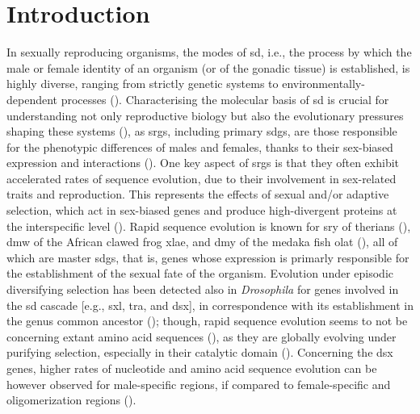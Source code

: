 \section{Introduction} \label{chapter3_introduction}
In sexually reproducing organisms, the modes of \gls{sd}, i.e., the process by which the male or female identity of an organism (or of the gonadic tissue) is established, is highly diverse, ranging from strictly genetic systems to environmentally-dependent processes (\textbf{\cite{haag2005sex, uller2011origin, bachtrog2014sex, beukeboom2014evolution}}). Characterising the molecular basis of \gls{sd} is crucial for understanding not only reproductive biology but also the evolutionary pressures shaping these systems (\textbf{\cite{wilkins1995moving, ellegren2007evolution, grath2016sex, nicolini2023bivalves}}), as \glspl{srg}, including primary \glspl{sdg}, are those responsible for the phenotypic differences of males and females, thanks to their sex-biased expression and interactions (\textbf{\cite{ellegren2007evolution, beukeboom2014evolution, grath2016sex}}). One key aspect of \glspl{srg} is that they often exhibit accelerated rates of sequence evolution, due to their involvement in sex-related traits and reproduction. This represents the effects of sexual and/or adaptive selection, which act in sex-biased genes and produce high-divergent proteins at the interspecific level (\textbf{\cite{civetta1998sex, ellegren2007evolution, meisel2011towards, grath2016sex}}). Rapid sequence evolution is known for \gls{sry} of therians (\textbf{\cite{pamilo1997evolution, mawaribuchi2012molecular}}), \gls{dmw} of the African clawed frog \gls{xlae}, and \gls{dmy} of the medaka fish \gls{olat} (\textbf{\cite{mawaribuchi2012molecular}}), all of which are master \glspl{sdg}, that is, genes whose expression is primarly responsible for the establishment of the sexual fate of the organism. Evolution under episodic diversifying selection has been detected also in \textit{Drosophila} for genes involved in the \gls{sd} cascade [e.g., \gls{sxl}, \gls{tra}, and \gls{dsx}], in correspondence with its establishment in the genus common ancestor (\textbf{\cite{mullon2012drosophila_sxl, baral2019genetic}}); though, rapid sequence evolution seems to not be concerning extant amino acid sequences (\textbf{\cite{haerty2007evolution, baral2019genetic}}), as they are globally evolving under purifying selection, especially in their catalytic domain (\textbf{\cite{mullon2012drosophila_sxl, baral2019genetic}}). Concerning the \gls{dsx} genes, higher rates of nucleotide and amino acid sequence evolution can be however observed for male-specific regions, if compared to female-specific and oligomerization regions (\textbf{\cite{baral2019genetic}}).

